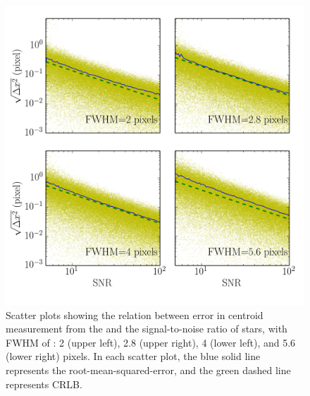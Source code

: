 \documentclass[12pt, preprint]{aastex}
\begin{document}
\begin{figure}[!htb]
  \includegraphics[width=\linewidth]{snr_psfpix28poly.png}
\endminipage
\caption{Scatter plots showing the relation between error in centroid measurement from the  and the signal-to-noise ratio of stars, with FWHM of : 2 (upper left), 2.8 (upper right), 4 (lower left), and 5.6 (lower right) pixels. In each scatter plot, the blue solid line represents the root-mean-squared-error, and the green dashed line represents CRLB.}\label{2}
\end{figure}
\end{document}
